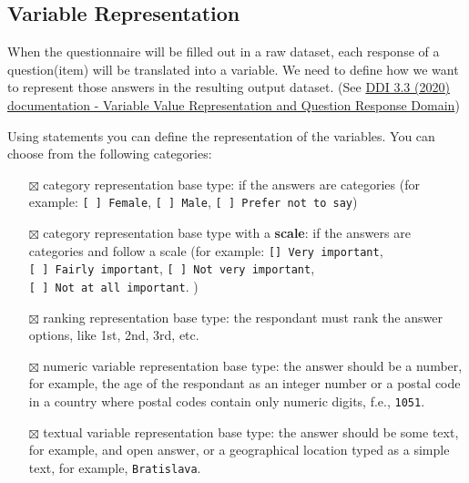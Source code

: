 \documentclass[
  letterpaper,
  DIV=11,
  numbers=noendperiod]{scrreprt}
\begin{document}
\subsection{Variable Representation}\label{variable-representation}

When the questionnaire will be filled out in a raw dataset, each
response of a question(item) will be translated into a variable. We need
to define how we want to represent those answers in the resulting output
dataset. (See
\href{https://ddi-lifecycle-documentation.readthedocs.io/en/latest/TechnicalGuide/Value\%20Representation\%20and\%20Response\%20Domain.html}{DDI
3.3 (2020) documentation - Variable Value Representation and Question
Response Domain})

Using statements you can define the representation of the variables. You
can choose from the following categories:

\begin{itemize}
\item[$\boxtimes$]
  category representation base type: if the answers are categories (for
  example: \texttt{{[}\ {]}\ Female}, \texttt{{[}\ {]}\ Male},
  \texttt{{[}\ {]}\ Prefer\ not\ to\ say})
\item[$\boxtimes$]
  category representation base type with a \textbf{scale}: if the
  answers are categories and follow a scale (for example:
  \texttt{{[}{]}\ Very\ important},
  \texttt{{[}\ {]}\ Fairly\ important},
  \texttt{{[}\ {]}\ Not\ very\ important},
  \texttt{{[}\ {]}\ Not\ at\ all\ important}. )
\item[$\boxtimes$]
  ranking representation base type: the respondant must rank the answer
  options, like 1st, 2nd, 3rd, etc.
\item[$\boxtimes$]
  numeric variable representation base type: the answer should be a
  number, for example, the age of the respondant as an integer number or
  a postal code in a country where postal codes contain only numeric
  digits, f.e., \texttt{1051}.
\item[$\boxtimes$]
  textual variable representation base type: the answer should be some
  text, for example, and open answer, or a geographical location typed
  as a simple text, for example, \texttt{Bratislava}.
\end{itemize}
\end{document}
